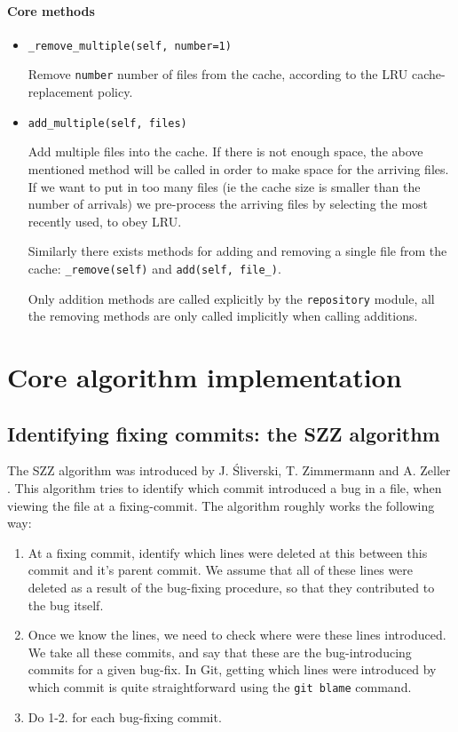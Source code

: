 \documentclass[12pt,twoside,notitlepage]{report}
\begin{document}
\paragraph{Core methods}
\begin{itemize}
\item \texttt{\_remove\_multiple(self, number=1)} 

Remove \texttt{number} number of files from the cache, according to the LRU cache-replacement policy.

\item \texttt{add\_multiple(self, files)}

Add multiple files into the cache. If there is not enough space,  the above mentioned method will be called in order to make space for the arriving files. If we want to put in too many files (ie the cache size is smaller than the number of arrivals) we pre-process the arriving files by selecting the most recently used, to obey LRU.

Similarly there exists methods for adding and removing a single file from the cache: \texttt{\_remove(self)} and \texttt{add(self, file\_)}. 

Only addition methods are called explicitly by the \texttt{repository} module, all the removing methods are only called implicitly when calling additions.

\end{itemize}
\section{Core algorithm implementation}
\subsection{Identifying fixing commits: the SZZ algorithm}
The SZZ algorithm was introduced by J. \'Sliverski, T. Zimmermann and A. Zeller \cite{SZZ}. This algorithm tries to identify which commit introduced a bug in a file, when viewing the file at a fixing-commit. The algorithm roughly works the following way:
\begin{enumerate}
\item At a fixing commit, identify which lines were deleted at this between this commit and it's parent commit. We assume that all of these lines were deleted as a result of the bug-fixing procedure, so that they contributed to the bug itself.
\item Once we know the lines, we need to check where were these lines introduced. We take all these commits, and say that these are the bug-introducing commits for a given bug-fix. In Git, getting which lines were introduced by which commit is quite straightforward using the \texttt{git blame} command.
\item Do 1-2. for each bug-fixing commit.
\end{enumerate}
\end{document}
